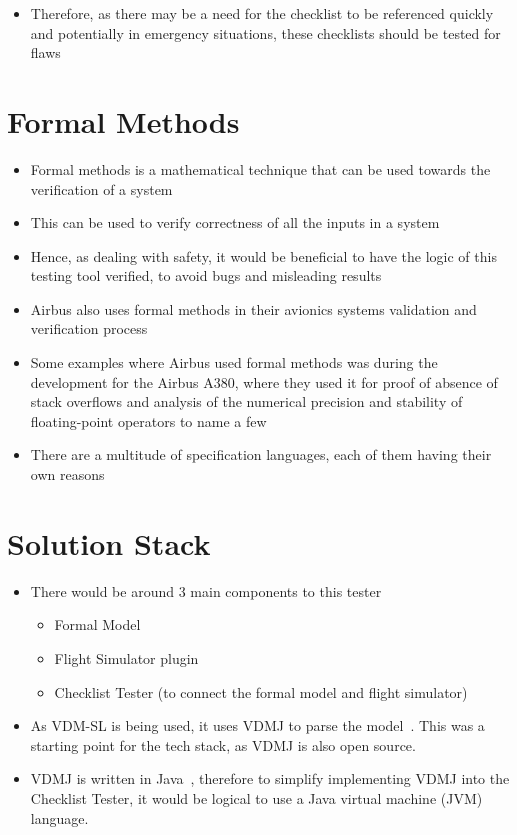 \documentclass[../dissertation.tex]{subfiles}
\begin{document}
\begin{itemize}
  \item Therefore, as there may be a need for the checklist to be
    referenced quickly and potentially in emergency situations,
    these checklists should be tested for flaws 
\end{itemize}


\section{Formal Methods}

\begin{itemize}
  \item Formal methods is a mathematical technique that can be used towards the
    verification of a system~\cite{nasa:formal}
  \item This can be used to verify correctness of all the inputs in a system~\cite{nasa:formal}
  \item Hence, as dealing with safety, it would be beneficial to have
    the logic of this testing tool verified, to avoid bugs and misleading results
  \item Airbus also uses formal methods in their avionics systems validation and
    verification process~\cite{airbus:formal}
  \item Some examples where Airbus used formal methods was during the development
    for the Airbus A380, where they used it for proof of absence of stack overflows
    and analysis of the numerical precision and stability of floating-point operators
    to name a few~\cite{airbus:formal}
  \item There are a multitude of specification languages, each of them
    having their own reasons %
\end{itemize}


\section{Solution Stack}
\begin{itemize}
  \item There would be around 3 main components to this tester
    \begin{itemize}
      \item Formal Model
      \item Flight Simulator plugin
      \item Checklist Tester (to connect the formal model and flight simulator)
    \end{itemize}
  \item As VDM-SL is being used, it uses VDMJ to parse the model~\cite{vdmj}. This was a starting
    point for the tech stack, as VDMJ is also open source.
  \item VDMJ is written in Java~\cite{vdmj}, therefore to simplify implementing VDMJ into the
    Checklist Tester, it would be logical to use a Java virtual machine (JVM) language.
\end{itemize}
\end{document}
